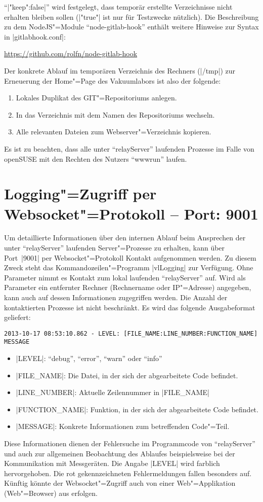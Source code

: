 \documentclass[titlepage=false,toc=nobibliography]{vl-report}
\newcommand*\theServer{relayServer}
\begin{document}
"`|"keep":false|"' wird festgelegt, dass temporär erstellte Verzeichnisse
nicht erhalten bleiben sollen (|"true"| ist nur für Testzwecke nützlich). Die
Beschreibung zu dem NodeJS"=Module "`node-gitlab-hook"' enthält weitere
Hinweise zur Syntax in |gitlabhook.conf|: \par\smallskip
\url{https://github.com/rolfn/node-gitlab-hook} \par\smallskip
\noindent
Der konkrete Ablauf im temporären Verzeichnis des Rechners
(|/tmp|) zur Erneuerung der Home"=Page des Vakuumlabors ist also der
folgende:
\begin{enumerate}
  \item Lokales Duplikat des GIT"=Repositoriums anlegen.
  \item In das Verzeichnis mit dem Namen des Repositoriums wechseln.
  \item Alle relevanten Dateien zum Webserver"=Verzeichnis kopieren.
\end{enumerate}
Es ist zu beachten, dass alle unter "`\theServer"' laufenden Prozesse
im Falle von openSUSE mit den Rechten des Nutzers "`wwwrun"' laufen.

\section{Logging"=Zugriff per Websocket"=Protokoll -- Port: 9001}

Um detaillierte Informationen über den internen Ablauf beim Ansprechen der
unter "`\theServer"' laufenden Server"=Prozesse zu erhalten, kann über
Port~|9001| per Websocket"=Protokoll Kontakt aufgenommen werden. Zu
diesem Zweck steht das Kommandozeilen"=Programm |vlLogging| zur Verfügung.
Ohne Parameter nimmt es Kontakt zum lokal laufenden "`\theServer"' auf.
Wird als Parameter ein entfernter Rechner (Rechnername oder IP"=Adresse)
angegeben, kann auch auf dessen Informationen zugegriffen
werden. Die Anzahl der kontaktierten Prozesse ist nicht beschränkt. Es wird
das folgende Ausgabeformat geliefert:
\begin{lstlisting}[language={}]
2013-10-17 08:53:10.862 - LEVEL: [FILE_NAME:LINE_NUMBER:FUNCTION_NAME] MESSAGE
\end{lstlisting}
\begin{itemize}
  \item |LEVEL|: "`debug"', "`error"', "`warn"' oder "`info"'
  \item |FILE_NAME|: Die Datei, in der sich der abgearbeitete Code befindet.
  \item |LINE_NUMBER|: Aktuelle Zeilennummer in |FILE_NAME|
  \item |FUNCTION_NAME|: Funktion, in der sich der abgearbeitete Code befindet.
  \item |MESSAGE|: Konkrete Informationen zum betreffenden Code"=Teil.
\end{itemize}
%
Diese Informationen dienen der Fehlersuche im Programmcode von
"`\theServer"' und auch zur allgemeinen Beobachtung des Ablaufes
beispielsweise bei der Kommunikation mit Messgeräten. Die Angabe |LEVEL|
wird farblich hervorgehoben. Die rot gekennzeichneten Fehlermeldungen fallen
besonders auf. Künftig könnte der Websocket"=Zugriff auch von einer
Web"=Applikation (Web"=Browser) aus erfolgen.
\end{document}
